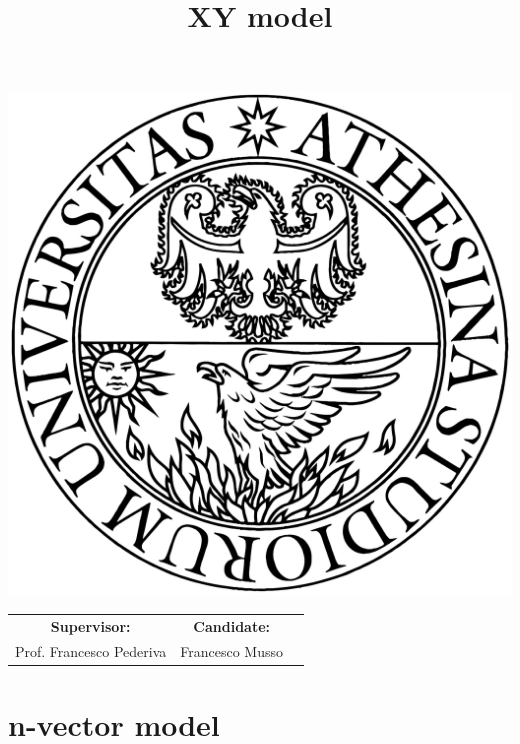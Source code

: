 \documentclass{beamer}
\title{XY model}
\date{}
\begin{document}
\begin{frame}[plain]

\begin{center}
\includegraphics[scale=0.07]{logo.png}\\ 
\end{center}

\maketitle

\begin{center}
    \begin{tabular}{ccc}
    {\bfseries Supervisor:} & \hspace{3cm} {\bfseries Candidate:}\\
    Prof. Francesco Pederiva & \hspace{3cm} Francesco Musso \\
    \end{tabular}
\end{center}

\end{frame}


\section{n-vector model}
\end{document}
